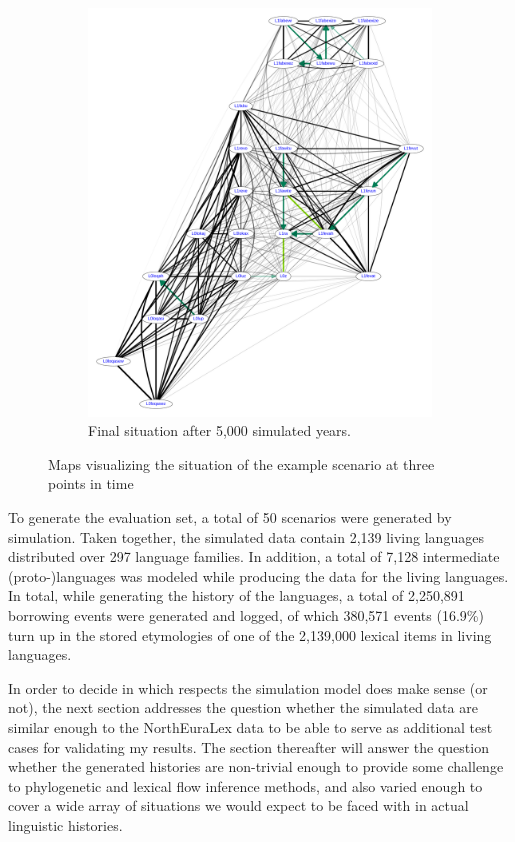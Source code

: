 \begin{figure}
%
\begin{subfigure}{0.4\hsize}
 \centering
 \includegraphics[scale=0.12]{figures/sim-example-present-map.pdf}
 \caption{Final situation after 5,000 simulated years.}
 \label{simulated-map-present}
\end{subfigure}
 \caption{Maps visualizing the situation of the example scenario at three points in time}
 \label{simulated-maps}
\end{figure}

To generate the evaluation set, a total of 50 scenarios were generated by simulation. Taken together, the simulated data contain 2,139 living languages distributed over 297 language families. In addition, a total of 7,128 intermediate (proto-)languages was modeled while producing the data for the living languages. In total, while generating the history of the languages, a total of 2,250,891 borrowing events were generated and logged, of which 380,571 events (16.9\%) turn up in the stored etymologies of one of the 2,139,000 lexical items in living languages.

In order to decide in which respects the simulation model does make sense (or not), the next section addresses the question whether the simulated data are similar enough to the NorthEuraLex data to be able to serve as additional test cases for validating my results. The section thereafter will answer the question whether the generated histories are non-trivial enough to provide some challenge to phylogenetic and lexical flow inference methods, and also varied enough to cover a wide array of situations we would expect to be faced with in actual linguistic histories.

